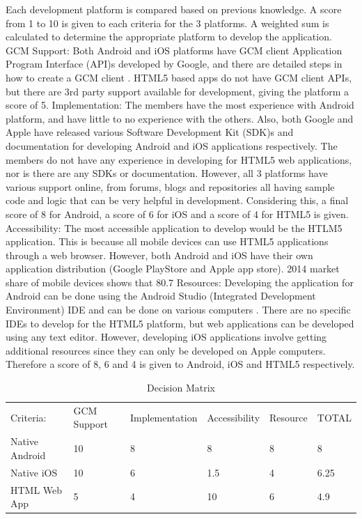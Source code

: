 \documentclass{article}
\begin{document}
Each development platform is compared based on previous knowledge. A score from 1 to 10 is given to each criteria for the 3 platforms. A weighted sum is calculated to determine the appropriate platform to develop the application.
GCM Support: Both Android and iOS platforms have GCM client Application Program Interface (API)s developed by Google, and there are detailed steps in how to create a GCM client \cite{gcm}. HTML5 based apps do not have GCM client APIs, but there are 3rd party support available for development, giving the platform a score of 5.
Implementation: The members have the most experience with Android platform, and have little to no experience with the others. Also, both Google and Apple have released various Software Development Kit (SDK)s and documentation for developing Android and iOS applications respectively. The members do not have any experience in developing for HTML5 web applications, nor is there are any SDKs or documentation. However, all 3 platforms have various support online, from forums, blogs and repositories all having sample code and logic that can be very helpful in development. Considering this, a final score of 8 for Android, a score of 6 for iOS and a score of 4 for HTML5 is given.
Accessibility: The most accessible application to develop would be the HTLM5 application. This is because all mobile devices can use HTML5 applications through a web browser. However, both Android and iOS have their own application distribution (Google PlayStore and Apple app store). 2014 market share of mobile devices shows that 80.7%
Resources: Developing the application for Android can be done using the Android Studio (Integrated Development Environment) IDE and can be done on various computers \cite{astudio}. There are no specific IDEs to develop for the HTML5 platform, but web applications can be developed using any text editor. However, developing iOS applications involve getting additional resources since they can only be developed on Apple computers.  Therefore a score of 8, 6 and 4 is given to Android, iOS and HTML5 respectively.

\begin{table}[H]
\centering
\caption{Decision Matrix}
\label{fig:decision-matrix}
\begin{tabular}{llllll}
Criteria:      & GCM Support & Implementation & Accessibility & Resource & TOTAL \\
Native Android & 10          & 8              & 8             & 8        & 8     \\
Native iOS     & 10          & 6              & 1.5           & 4        & 6.25  \\
HTML Web App   & 5           & 4              & 10            & 6        & 4.9  
\end{tabular}
\end{table}
\end{document}
